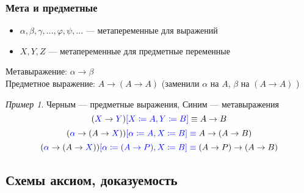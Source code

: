 \documentclass[english]{article}
\theoremstyle{plain}
\theoremstyle{remark}
\newtheorem*{examp}{Пример}
\theoremstyle{definition}
\begin{document}
\subsubsection{Мета и предметные}
\label{sec:org785537b}
\begin{itemize}
\item \(\alpha, \beta, \gamma, \dots, \varphi, \psi, \dots\) --- метапеременные для выражений
\item \(X, Y, Z\) --- метапеременные для предметные переменные
\end{itemize}
Метавыражение: \(\alpha \to \beta\) \\
Предметное выражение: \(A \to (A \to A)\) (заменили \(\alpha\) на \(A\), \(\beta\) на \((A \to A)\) )
\begin{examp}
Черным --- предметные выражения, Синим --- метавыражения
\[ (\color{blue}X \color{black}\to\color{blue} Y\color{black})\color{blue}[X \coloneqq A, Y \coloneqq B] \color{black} \equiv A \to B \]
\[ (\color{blue}\alpha \color{black} \to (A \to \color{blue}X \color{black}))\color{blue}[\alpha \coloneqq A, X \coloneqq B] \equiv \color{black} A \to (A \to B) \]
\[ (\color{blue}\alpha \color{black} \to (A \to \color{blue}X \color{black}))\color{blue}[\alpha \coloneqq (A \to P), X \coloneqq B] \equiv \color{black} (A \to P) \to (A \to B) \]
\end{examp}
\subsection{Схемы аксиом, доказуемость}
\label{sec:orgaf67aa8}
\end{document}
